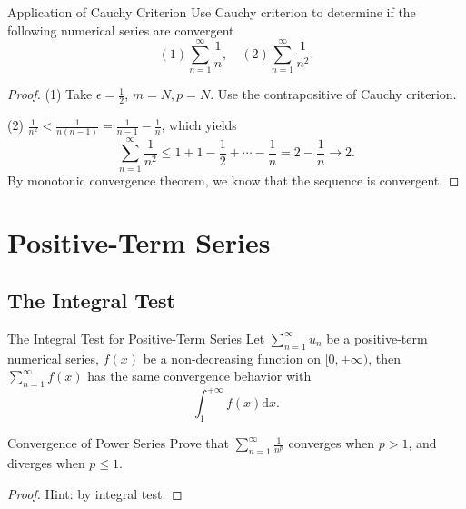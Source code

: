 \begin{example}{Application of Cauchy Criterion}{}
  Use Cauchy criterion to determine if the following numerical series are convergent
  \begin{equation}
  (1) \sum\limits_{n = 1}^{\infty}\frac{1}{n}, \quad
  (2) \sum\limits_{n = 1}^{\infty} \frac{1}{n^2}.
  \end{equation}
\end{example}

\begin{proof}
  (1) Take $\epsilon = \frac{1}{2}$, $m = N, p = N$.
  Use the contrapositive of Cauchy criterion.

  (2) $\frac{1}{n^2} < \frac{1}{n(n-1)} = \frac{1}{n-1} - \frac{1}{n}$,
  which yields
  \begin{equation}
    \sum\limits_{n = 1}^{\infty} \frac{1}{n^2}
    \leq 1 + 1 - \frac{1}{2} + \cdots - \frac{1}{n} = 2 - \frac{1}{n} \rightarrow 2.
  \end{equation}
  By monotonic convergence theorem, we know that the sequence is convergent.
\end{proof}

\section{Positive-Term Series}

\subsection{The Integral Test}

\begin{theorem}{The Integral Test for Positive-Term Series}{}
  Let $\sum\limits_{n = 1}^{\infty}u_n$ be a positive-term numerical series,
  $f(x)$ be a non-decreasing function on $[0, +\infty)$,
  then $\sum\limits_{n = 1}^{\infty} f(x)$ has the same convergence behavior with
  \begin{equation}
    \int_1^{+\infty} f(x) \mathrm{d} x.
  \end{equation}
\end{theorem}

\begin{example}{Convergence of Power Series}{}
  Prove that $\sum\limits_{n = 1}^{\infty} \frac{1}{n^p}$ converges when $p >
  1$,
  and diverges when $p \leq 1$.
\end{example}

\begin{proof}
  Hint: by integral test.
\end{proof}

